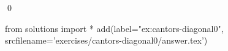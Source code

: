 
\begin{ex} 
  \label{ex:cantors-diagonal0}
  
  \qed
\end{ex} 
\begin{python0}
from solutions import *
add(label="ex:cantors-diagonal0",
    srcfilename='exercises/cantors-diagonal0/answer.tex') 
\end{python0}
